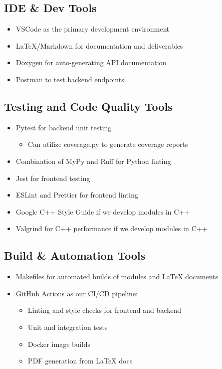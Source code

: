 \documentclass{article}
\begin{document}
\subsection*{IDE \& Dev Tools}
\begin{itemize}
    \item VSCode as the primary development environment
    \item LaTeX/Markdown for documentation and deliverables
    \item Doxygen for auto-generating API documentation
    \item Postman to test backend endpoints
\end{itemize}

\subsection*{Testing and Code Quality Tools}
\begin{itemize}
    \item Pytest for backend unit testing
    \begin{itemize}
        \item Can utilize coverage.py to generate coverage reports
    \end{itemize}
    \item Combination of MyPy and Ruff for Python linting
    \item Jest for frontend testing
    \item ESLint and Prettier for frontend linting
    \item Google C++ Style Guide if we develop modules in C++
    \item Valgrind for C++ performance if we develop modules in C++
\end{itemize}

\subsection*{Build \& Automation Tools}
\begin{itemize}
    \item Makefiles for automated builds of modules and LaTeX documents
    \item GitHub Actions as our CI/CD pipeline:
    \begin{itemize}
        \item Linting and style checks for frontend and backend
        \item Unit and integration tests
        \item Docker image builds
        \item PDF generation from LaTeX docs
    \end{itemize}
\end{itemize}
\end{document}
